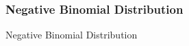 \documentclass{beamer}
\begin{document}
\begin{frame}
    \frametitle{Negative Binomial Distribution} 
\begin{block}{Negative Binomial Distribution}
    
\end{block}
    

\end{frame}
\end{document}
